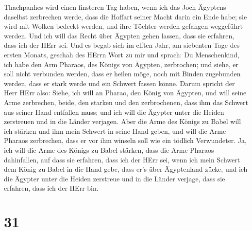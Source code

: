  Thachpanhes wird einen finsteren Tag haben, wenn ich das
Joch Ägyptens daselbst zerbrechen werde, dass die Hoffart seiner Macht
darin ein Ende habe; sie wird mit Wolken bedeckt werden, und ihre
Töchter werden gefangen weggeführt werden.  Und ich will
das Recht über Ägypten gehen lassen, dass sie erfahren, dass ich der
HErr sei.  Und es begab sich im elften Jahr, am siebenten
Tage des ersten Monats, geschah des HErrn Wort zu mir und sprach:
 Du Menschenkind, ich habe den Arm Pharaos, des Königs
von Ägypten, zerbrochen; und siehe, er soll nicht verbunden werden, dass
er heilen möge, noch mit Binden zugebunden werden, dass er stark werde
und ein Schwert fassen könne.  Darum spricht der Herr
HErr also: Siehe, ich will an Pharao, den König von Ägypten, und will
seine Arme zerbrechen, beide, den starken und den zerbrochenen, dass ihm
das Schwert aus seiner Hand entfallen muss;  und ich will
die Ägypter unter die Heiden zerstreuen und in die Länder verjagen.
 Aber die Arme des Königs zu Babel will ich stärken und
ihm mein Schwert in seine Hand geben, und will die Arme Pharaos
zerbrechen, dass er vor ihm winseln soll wie ein tödlich Verwundeter.
 Ja, ich will die Arme des Königs zu Babel stärken, dass
die Arme Pharaos dahinfallen, auf dass sie erfahren, dass ich der HErr
sei, wenn ich mein Schwert dem König zu Babel in die Hand gebe, dass
er's über Ägyptenland zücke,  und ich die Ägypter unter
die Heiden zerstreue und in die Länder verjage, dass sie erfahren, dass
ich der HErr bin.

\hypertarget{section-30}{%
\section{31}\label{section-30}}

